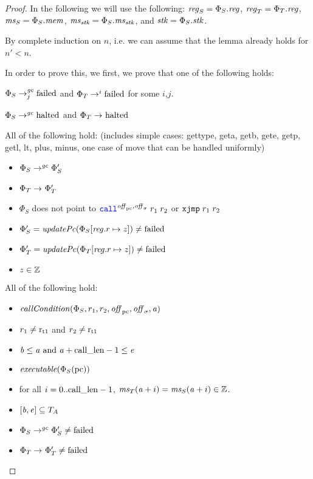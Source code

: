 \begin{proof}
  In the following we will use the following: $\reg_S = \Phi_S.\reg$, $\reg_T = \Phi_T.\reg$, $\ms_S = \Phi_S.\mem$, $\ms_\stk = \Phi_S.\ms_\stk$, and $\stk = \Phi_S.\stk$.

  By complete induction on $n$, i.e. we can assume that the lemma already holds for $n' < n$.

  In order to prove this, we first, we prove that one of the following holds:
  \begin{enumproof}
  \item \label{case:ftlr:failed} $\Phi_S \nstep[j]{\gc} \failed$ and $\Phi_T
    \step[i] \failed$ for some $i$,$j$.
  \item \label{case:ftlr:halted} $\Phi_S \step[\gc] \halted$ and $\Phi_T \step\halted$
  \item \label{case:ftlr:get-and-arith-op} All of the following hold: (includes simple cases: gettype, geta, getb,
    gete, getp, getl, lt, plus, minus, one case of move that can be handled
    uniformly)
    \begin{itemize}
    \item $\Phi_S \step[\gc] \Phi_S'$
    \item $\Phi_T \step \Phi_T'$
    \item $\Phi_S$ does not point to $\scall{\offpc,\offsigma}{r_1}{r_2}$ or $\txjmp{r_1}{r_2}$
    \item $\Phi_S' = \updPcAddr{\Phi_S\updReg{r}{z}} \neq \failed$
    \item $\Phi_T' = \updPcAddr{\Phi_T\updReg{r}{z}} \neq \failed$
    \item $z \in \ints$
    \end{itemize}
  \item \label{case:ftlr:call} All of the following hold:
    \begin{itemize}
    \item $\callCond{\Phi_S,r_1,r_2,\offpc,\offsigma,\aaddr}$
    \item $r_1 \neq \rtmp{1}$ and $r_2 \neq \rtmp{1}$
    \item $\baddr \leq \aaddr \tand \aaddr + \calllen-1 \leq \eaddr$
    \item $\exec{\Phi_S(\pcreg)}$
    \item for all $i = 0..\calllen-1$, $\ms_T(\aaddr+i) = \ms_S(\aaddr+i) \in \ints$.
    \item $[\baddr,\eaddr] \subseteq \ta$
    \item $\Phi_S \step[\gc] \Phi_S' \neq \failed$
    \item $\Phi_T \step \Phi_T' \neq \failed$

\end{itemize}
\end{enumproof}
\end{proof}
